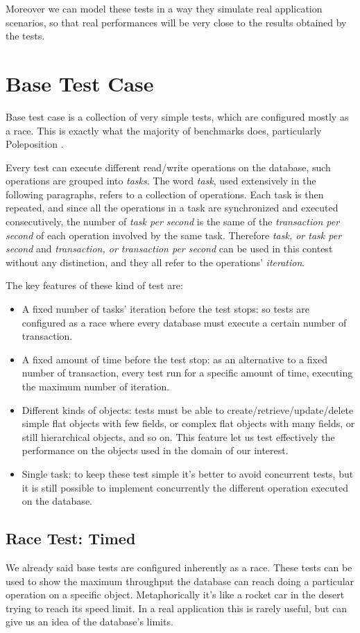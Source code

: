 Moreover we can model these tests in a way they simulate real application scenarios, so that real performances will be very close to the results obtained by the tests.

	\section{Base Test Case}
Base test case is a collection of very simple tests, which are configured mostly as a race. This is exactly what the majority of benchmarks does, particularly Poleposition \cite{poleposition}.

Every test can execute different read/write operations on the database, such operations are grouped into \emph{tasks}. The word \emph{task}, used extensively in the following paragraphs, refers to a collection of operations. Each task is then repeated, and since all the operations in a task are synchronized and executed consecutively, the number of \emph{task per second} is the same of the \emph{transaction per second} of each operation involved by the same task. Therefore \emph{task, or task per second} and \emph{transaction, or transaction per second} can be used in this contest without any distinction, and they all refer to the operations' \emph{iteration}.

The key features of these kind of test are:
\begin{itemize}
	\item A fixed number of tasks' iteration before the test stops: so tests are configured as a race where every database must execute a certain number of transaction.
	\item A fixed amount of time before the test stop: as an alternative to a fixed number of transaction, every test run for a specific amount of time, executing the maximum number of iteration. 
	\item Different kinds of objects: tests must be able to create/retrieve/update/delete simple flat objects with few fields, or complex flat objects with many fields, or still hierarchical objects, and so on. This feature let us test effectively the performance on the objects used in the domain of our interest.
	\item Single task: to keep these test simple it's better to avoid concurrent tests, but it is still possible to implement concurrently the different operation executed on the database.%
\end{itemize}
	
		\subsection{Race Test: Timed}
We already said base tests are configured inherently as a race. These tests can be used to show the maximum throughput the database can reach doing a particular operation on a specific object. Metaphorically it's like a rocket car in the desert trying to reach its speed limit. In a real application this is rarely useful, but can give us an idea of the database's limits. 

